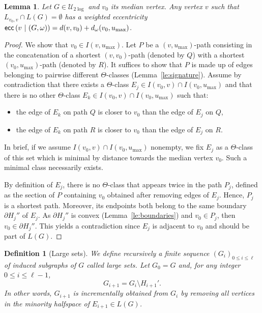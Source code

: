 \documentclass[11pt,letterpaper]{article}
\newtheorem{lemma}{Lemma}
\newtheorem{definition}{Definition}
\newcommand{\wecc}[2]{\mbox{\textsf{ecc}}\left(#1 ~\vert ~ #2\right)}
\newcommand{\ulog}{\mathcal{U}_{2\log}}
\newcommand{\umax}{u_{\max}}
\begin{document}
\begin{lemma}
Let $G \in \ulog$ and $v_0$ its median vertex. Any vertex $v$ such that $L_{v_0,v} \cap L(G) = \emptyset$ has a weighted eccentricity $\wecc{v}{(G,\omega)} = d(v,v_0) + d_{\omega}(v_0,\umax)$.
\label{le:ecc_large}
\end{lemma}
\begin{proof}
We show that $v_0 \in I(v,\umax)$. Let $P$ be a $(v,\umax)$-path consisting in the concatenation of a shortest $(v,v_0)$-path (denoted by $Q$) with a shortest $(v_0,\umax)$-path (denoted by $R$). It suffices to show that $P$ is made up of edges belonging to pairwise different $\Theta$-classes (Lemma~\ref{le:signature}). Assume by contradiction that there exists a $\Theta$-class $E_j \in I(v_0,v) \cap I(v_0,\umax)$ and that there is no other $\Theta$-class $E_k \in I(v_0,v) \cap I(v_0,\umax)$ such that:
\begin{itemize}
\item the edge of $E_k$ on path $Q$ is closer to $v_0$ than the edge of $E_j$ on $Q$,
\item the edge of $E_k$ on path $R$ is closer to $v_0$ than the edge of $E_j$ on $R$.
\end{itemize}
In brief, if we assume $I(v_0,v) \cap I(v_0,\umax)$ nonempty, we fix $E_j$ as a $\Theta$-class of this set which is minimal by distance towards the median vertex $v_0$. Such a minimal class necessarily exists.

By definition of $E_j$, there is no $\Theta$-class that appears twice in the path $P_j$, defined as the section of $P$ containing $v_0$ obtained after removing edges of $E_j$. Hence, $P_j$ is a shortest path. Moreover, its endpoints both belong to the same boundary $\partial H_j''$ of $E_j$. As $\partial H_j''$ is convex (Lemma~\ref{le:boundaries}) and $v_0 \in P_j$, then $v_0 \in \partial H_j''$. This yields a contradiction since $E_j$ is adjacent to $v_0$ and should be part of $L(G)$.
\end{proof}

\begin{definition}[Large sets]
We define recursively a finite sequence $\left(G_i\right)_{0\le i\le \ell}$ of induced subgraphs of $G$ called {\em large sets}. Let $G_0 = G$ and, for any integer $0\le i\le \ell - 1$,
$$G_{i+1} = G_i \setminus H_{i+1}'.$$
In other words, $G_{i+1}$ is incrementally obtained from $G_i$ by removing all vertices in the minority halfspace of $E_{i+1} \in L(G)$.
\label{def:large_sets}
\end{definition}
\end{document}
